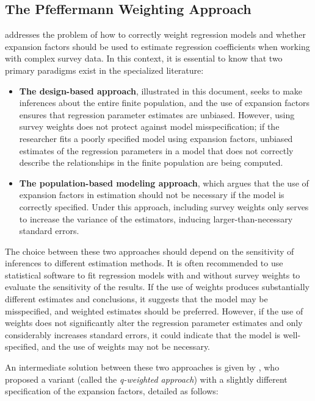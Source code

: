 \documentclass[
  12pt,
]{book}
\providecommand{\tightlist}{%
  \setlength{\itemsep}{0pt}\setlength{\parskip}{0pt}}
\begin{document}
\hypertarget{the-pfeffermann-weighting-approach}{%
\subsection{The Pfeffermann Weighting Approach}\label{the-pfeffermann-weighting-approach}}

\citet{Heeringa_West_Berglund_2017} addresses the problem of how to correctly weight regression models and whether expansion factors should be used to estimate regression coefficients when working with complex survey data. In this context, it is essential to know that two primary paradigms exist in the specialized literature:

\begin{itemize}
\tightlist
\item
  \textbf{The design-based approach}, illustrated in this document, seeks to make inferences about the entire finite population, and the use of expansion factors ensures that regression parameter estimates are unbiased. However, using survey weights does not protect against model misspecification; if the researcher fits a poorly specified model using expansion factors, unbiased estimates of the regression parameters in a model that does not correctly describe the relationships in the finite population are being computed.
\item
  \textbf{The population-based modeling approach}, which argues that the use of expansion factors in estimation should not be necessary if the model is correctly specified. Under this approach, including survey weights only serves to increase the variance of the estimators, inducing larger-than-necessary standard errors.
\end{itemize}

The choice between these two approaches should depend on the sensitivity of inferences to different estimation methods. It is often recommended to use statistical software to fit regression models with and without survey weights to evaluate the sensitivity of the results. If the use of weights produces substantially different estimates and conclusions, it suggests that the model may be misspecified, and weighted estimates should be preferred. However, if the use of weights does not significantly alter the regression parameter estimates and only considerably increases standard errors, it could indicate that the model is well-specified, and the use of weights may not be necessary.

An intermediate solution between these two approaches is given by \citet{pfeffermann2011modelling}, who proposed a variant (called the \emph{q-weighted approach}) with a slightly different specification of the expansion factors, detailed as follows:
\end{document}
